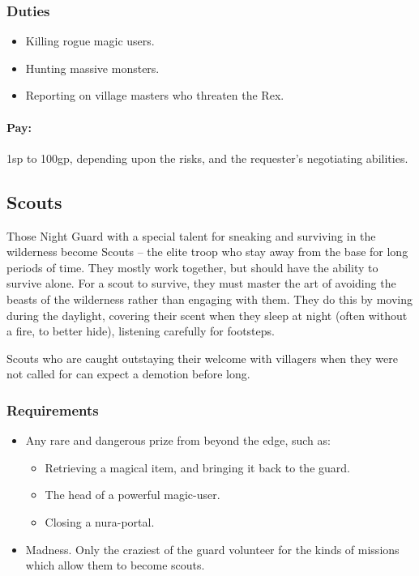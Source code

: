 \begin{multicols}{2}
\subsubsection{Duties}

\begin{itemize}
  \item
  Killing rogue magic users.
  \item
  Hunting massive monsters.
  \item
  Reporting on village masters who threaten the Rex.
\end{itemize}

\paragraph{Pay:} 1sp to 100gp, depending upon the risks, and the requester's negotiating abilities.

\subsection{Scouts}

Those Night Guard with a special talent for sneaking and surviving in the wilderness become Scouts -- the elite troop who stay away from the base for long periods of time.
They mostly work together, but should have the ability to survive alone.
For a scout to survive, they must master the art of avoiding the beasts of the wilderness rather than engaging with them.
They do this by moving during the daylight, covering their scent when they sleep at night (often without a fire, to better hide), listening carefully for footsteps.

Scouts who are caught outstaying their welcome with villagers when they were not called for can expect a demotion before long.

\subsubsection{Requirements}

\begin{itemize}
  \item
  Any rare and dangerous prize from beyond the \gls{edge}, such as:
  \begin{itemize}
    \item
    Retrieving a magical item, and bringing it back to the \gls{guard}.
    \item
    The head of a powerful magic-user.
    \item
    Closing a nura-portal.
  \end{itemize}
  \item
  Madness.
  Only the craziest of the \gls{guard} volunteer for the kinds of missions which allow them to become scouts.
\end{itemize}


\end{multicols}
